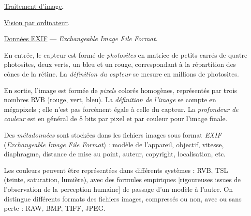 
\begin{jazzitemize}
\item \href{https://fr.wikipedia.org/wiki/Traitement_d\%27images}{Traitement d'image}.
\item \href{https://fr.wikipedia.org/wiki/Vision_par_ordinateur}{Vision par ordinateur}.
\item \href{https://fr.wikipedia.org/wiki/Exchangeable_image_file_format}{Données EXIF} --- \textit{Exchangeable Image File Format}.
\end{jazzitemize}


\begin{tcolorbox}[title={Données et information}, toprule=0pt, leftrule=0pt, rightrule=0pt, arc=0pt,
                  fonttitle=\scshape\boxtitlefont,
                  colbacktitle=white, coltitle=firstcolor, colframe=firstcolor, colback=firstcolor!10,
                  breakable, enhanced jigsaw]
En entrée, le capteur est formé de \emph{photosites} en matrice de petits carrés de quatre photosites, deux verts, un bleu et un rouge, correspondant à la répartition des cônes de la rétine. La \emph{définition du capteur} se mesure en millions de photosites.

En sortie, l’image est formée de \emph{pixels} colorés homogènes, représentés par trois nombres RVB (rouge, vert, bleu). La \emph{définition de l'image} se compte en mégapixels ; elle n’est pas forcément égale à celle du capteur. La \emph{profondeur de couleur} est en général de 8 bits par pixel et par couleur pour l’image finale.

Des \emph{métadonnées} sont stockées dans les fichiers images sous format \emph{EXIF} (\textit{Exchangeable Image File Format}) : modèle de l’appareil, objectif, vitesse, diaphragme, distance de mise au point, auteur, copyright, localisation, etc.

Les couleurs peuvent être représentées dans différents systèmes : RVB, TSL (teinte, saturation, lumière), avec des formules empiriques [rigoureuses issues de l'observation de la perception humaine] de passage d’un modèle à l’autre. On distingue différents formats des fichiers images, compressés ou non, avec ou sans perte : RAW, BMP, TIFF, JPEG.
\end{tcolorbox}


